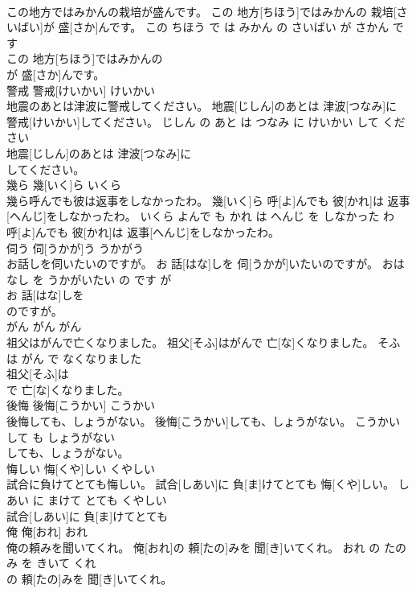 \documentclass[8pt]{extreport}
\begin{document}
\begin{CJK}{UTF8}{min}
\\	この地方ではみかんの栽培が盛んです。	この 地方[ちほう]ではみかんの 栽培[さいばい]が 盛[さか]んです。	この ちほう で は みかん の さいばい が さかん です	
\\	この 地方[ちほう]ではみかんの
\\	が 盛[さか]んです。			
\\	警戒	警戒[けいかい]	けいかい	
\\	地震のあとは津波に警戒してください。	地震[じしん]のあとは 津波[つなみ]に 警戒[けいかい]してください。	じしん の あと は つなみ に けいかい して ください	
\\	地震[じしん]のあとは 津波[つなみ]に
\\	してください。			
\\	幾ら	幾[いく]ら	いくら	
\\	幾ら呼んでも彼は返事をしなかったわ。	幾[いく]ら 呼[よ]んでも 彼[かれ]は 返事[へんじ]をしなかったわ。	いくら よんで も かれ は へんじ を しなかった わ	
\\	呼[よ]んでも 彼[かれ]は 返事[へんじ]をしなかったわ。			
\\	伺う	伺[うかが]う	うかがう	
\\	お話しを伺いたいのですが。	お 話[はな]しを 伺[うかが]いたいのですが。	おはなし を うかがいたい の です が	
\\	お 話[はな]しを
\\	のですが。			
\\	がん	がん	がん	
\\	祖父はがんで亡くなりました。	祖父[そふ]はがんで 亡[な]くなりました。	そふ は がん で なくなりました	
\\	祖父[そふ]は
\\	で 亡[な]くなりました。			
\\	後悔	後悔[こうかい]	こうかい	
\\	後悔しても、しょうがない。	後悔[こうかい]しても、しょうがない。	こうかい して も しょうがない	
\\	しても、しょうがない。			
\\	悔しい	悔[くや]しい	くやしい	
\\	試合に負けてとても悔しい。	試合[しあい]に 負[ま]けてとても 悔[くや]しい。	しあい に まけて とても くやしい	
\\	試合[しあい]に 負[ま]けてとても
\\	俺	俺[おれ]	おれ	
\\	俺の頼みを聞いてくれ。	俺[おれ]の 頼[たの]みを 聞[き]いてくれ。	おれ の たのみ を きいて くれ	
\\	の 頼[たの]みを 聞[き]いてくれ。			

\end{CJK}
\end{document}

